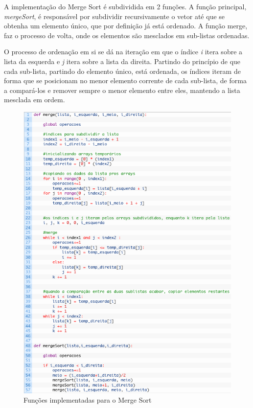 A implementação do Merge Sort é subdividida em 2 funções. A função principal, \textit{mergeSort}, é responsável por subdividir recursivamente o vetor até que se obtenha um elemento único, que por definição já está ordenado. A função merge, faz o processo de volta, onde os elementos são mesclados em sub-listas ordenadas. 

O processo de ordenação em si se dá na iteração em que o índice \textit{i} itera sobre a lista da esquerda e \textit{j} itera sobre a lista da direita. Partindo do princípio de que cada sub-lista, partindo do elemento único, está ordenada, os índices iteram de forma que se posicionam no menor elemento corrente de cada sub-lista, de forma a compará-los e remover sempre o menor elemento entre eles, mantendo a lista mesclada em ordem.


\begin{figure}[!htb]
\centering
\includegraphics[width=16cm]{img/codigo3.png}
\caption{Funções implementadas para o Merge Sort}
\label{fig:codigo3}
\end{figure}

